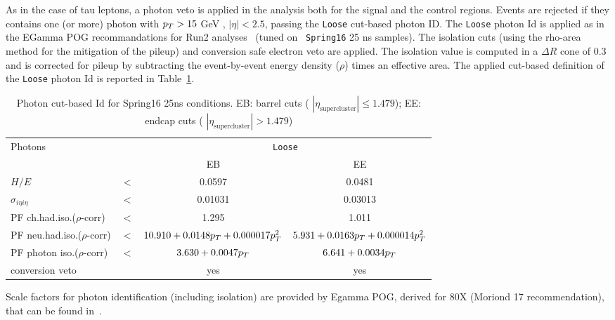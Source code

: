 As in the case of tau leptons, a photon veto is applied in the analysis both for the signal and the control regions.
Events are rejected if they contains one (or more) photon with $p_T > 15$ GeV , $|\eta| < 2.5$, passing the \texttt{Loose} cut-based photon ID. The \texttt{Loose} photon Id is applied as in the EGamma POG recommandations for Run2 analyses~\cite{EGammaPOG_pho} (tuned on \texttt{ Spring16} 25 ns samples).
The isolation cuts (using the rho-area method for the mitigation of the pileup) and conversion safe electron veto are applied.
The isolation value is computed in a $\Delta R$ cone of 0.3 and is corrected for pileup by subtracting the event-by-event energy density ($\rho$) times an effective area.
The applied cut-based definition of the \texttt{Loose} photon Id is reported in Table~\ref{tab:PhotonId}.
% 
 \begin{table}[htb]
  \centering
     \begin{tabular}{lccc}
      \hline
 
     Photons                                   &       & \multicolumn{2}{c}{\texttt{Loose}}\\
                                               &       & EB      & EE  \\
  \hline
     $H/E $                                    & $ < $ &0.0597   & 0.0481      \\
     $\sigma_{i\eta i\eta} $                   & $ < $ &0.01031  & 0.03013   \\
     PF ch.had.iso.($\rho$-corr)               & $ < $ &1.295    & 1.011   \\
     PF neu.had.iso.($\rho$-corr)              & $ < $ &$10.910+0.0148p_T+0.000017p_T^2$    &$5.931+0.0163p_T+0.000014p_T^2 $   \\
     PF photon iso.($\rho$-corr)               & $ < $ &$3.630+0.0047p_T$                 &$6.641+0.0034p_T $   \\
     conversion veto                           &       & yes     &yes     \\
  \hline
 \end{tabular}
  \caption{Photon cut-based Id for Spring16 25ns conditions. EB: barrel cuts ( $|\eta_\text{supercluster}| \leq 1.479$); EE: endcap cuts ( $|\eta_\text{supercluster}| > 1.479$)}\label{tab:PhotonId}
 \end{table}

Scale factors for photon identification (including isolation) are provided by Egamma POG, derived for 80X (Moriond 17 recommendation), that can be found in~\cite{EGammaPOG_ele_SF}.

